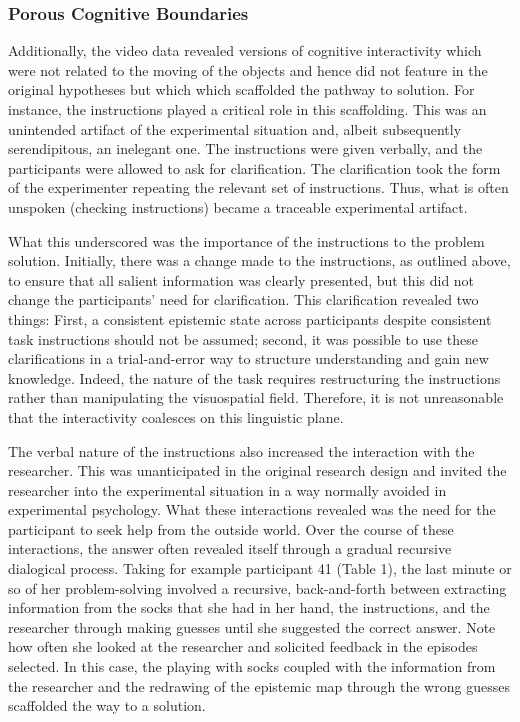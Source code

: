 \documentclass[twocolumn, serif, empirical, authordate]{jote-article}
\begin{document}
{{
\subsubsection{Porous Cognitive Boundaries}

Additionally, the video data revealed versions of cognitive interactivity which were not related to the moving of the objects and hence did not feature in the original hypotheses but which which scaffolded the pathway to solution. For instance, the instructions played a critical role in this scaffolding. This was an unintended artifact of the experimental situation and, albeit subsequently serendipitous, an inelegant one. The instructions were given verbally, and the participants were allowed to ask for clarification. The clarification took the form of the experimenter repeating the relevant set of instructions. Thus, what is often unspoken (checking instructions) became a traceable experimental artifact.

What this underscored was the importance of the instructions to the problem solution. Initially, there was a change made to the instructions, as outlined above, to ensure that all salient information was clearly presented, but this did not change the participants' need for clarification. This clarification revealed two things: First, a consistent epistemic state across participants despite consistent task instructions should not be assumed; second, it was possible to use these clarifications in a trial-and-error way to structure understanding and gain new knowledge. Indeed, the nature of the task requires restructuring the instructions rather than manipulating the visuospatial field. Therefore, it is not unreasonable that the interactivity coalesces on this linguistic plane.

The verbal nature of the instructions also increased the interaction with the researcher. This was unanticipated in the original research design and invited the researcher into the experimental situation in a way normally avoided in experimental psychology. What these interactions revealed was the need for the participant to seek help from the outside world. Over the course of these interactions, the answer often revealed itself through a gradual recursive dialogical process. Taking for example participant 41 (Table 1), the last minute or so of her problem-solving involved a recursive, back-and-forth between extracting information from the socks that she had in her hand, the instructions, and the researcher through making guesses until she suggested the correct answer. Note how often she looked at the researcher and solicited feedback in the episodes selected. In this case, the playing with socks coupled with the information from the researcher and the redrawing of the epistemic map through the wrong guesses scaffolded the way to a solution.

}}
\end{document}
